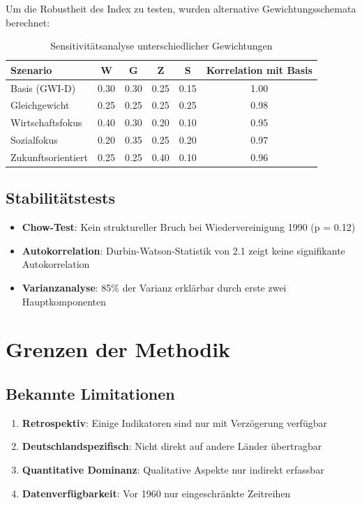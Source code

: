 Um die Robustheit des Index zu testen, wurden alternative Gewichtungsschemata berechnet:

\begin{table}[h]
\centering
\begin{tabular}{lccccc}
\toprule
\textbf{Szenario} & \textbf{W} & \textbf{G} & \textbf{Z} & \textbf{S} & \textbf{Korrelation mit Basis} \\
\midrule
Basis (GWI-D) & 0.30 & 0.30 & 0.25 & 0.15 & 1.00 \\
Gleichgewicht & 0.25 & 0.25 & 0.25 & 0.25 & 0.98 \\
Wirtschaftsfokus & 0.40 & 0.30 & 0.20 & 0.10 & 0.95 \\
Sozialfokus & 0.20 & 0.35 & 0.25 & 0.20 & 0.97 \\
Zukunftsorientiert & 0.25 & 0.25 & 0.40 & 0.10 & 0.96 \\
\bottomrule
\end{tabular}
\caption{Sensitivitätsanalyse unterschiedlicher Gewichtungen}
\label{tab:sensitivitaet}
\end{table}

\subsection{Stabilitätstests}

\begin{itemize}
\item \textbf{Chow-Test}: Kein struktureller Bruch bei Wiedervereinigung 1990 (p = 0.12)
\item \textbf{Autokorrelation}: Durbin-Watson-Statistik von 2.1 zeigt keine signifikante Autokorrelation
\item \textbf{Varianzanalyse}: 85\% der Varianz erklärbar durch erste zwei Hauptkomponenten
\end{itemize}

\section{Grenzen der Methodik}

\subsection{Bekannte Limitationen}

\begin{enumerate}
\item \textbf{Retrospektiv}: Einige Indikatoren sind nur mit Verzögerung verfügbar
\item \textbf{Deutschlandspezifisch}: Nicht direkt auf andere Länder übertragbar
\item \textbf{Quantitative Dominanz}: Qualitative Aspekte nur indirekt erfassbar
\item \textbf{Datenverfügbarkeit}: Vor 1960 nur eingeschränkte Zeitreihen
\end{enumerate}

